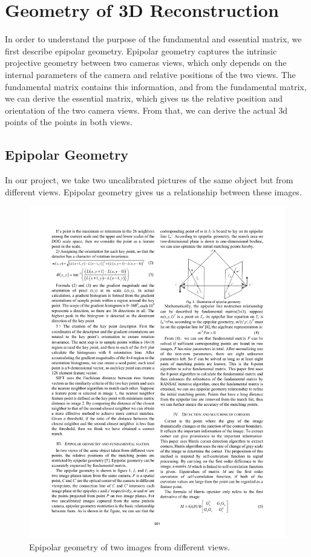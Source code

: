 \section{Geometry of 3D Reconstruction}
\label{s:fundamental}
In order to understand the purpose of the fundamental and essential matrix, we first describe epipolar geometry. Epipolar geometry captures the intrinsic projective geometry between two cameras views, which only depends on the internal parameters of the camera and relative positions of the two views. The fundamental matrix contains this information, and from the fundamental matrix, we can derive the essential matrix, which gives us the relative position and orientation of the two camera views. From that, we can derive the actual 3d points of the points in both views.

\subsection{Epipolar Geometry}
In our project, we take two uncalibrated pictures of the same object but from different views. Epipolar geometry gives us a relationship between these images.
\begin{figure}[!H]
\begin{center}
\includegraphics[width=0.9\linewidth]{figures/epipolar.pdf}
\end{center}
\caption{Epipolar geometry of two images from different views.}
\label{epipolar_pic}
\end{figure}

